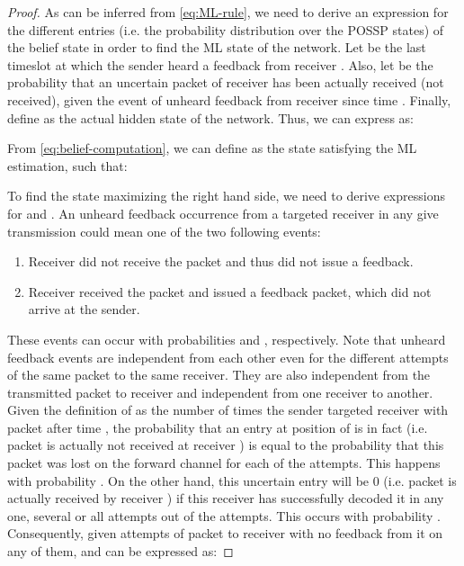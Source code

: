 \documentclass[10pt,jounral]{IEEEtran}
\begin{document}
\begin{proof}
As can be inferred from \eqref{eq:ML-rule}, we need to derive an expression for the different entries  (i.e. the probability distribution over the POSSP states) of the belief state in order to find the ML state of the network. Let  be the last timeslot at which the sender heard a feedback from receiver . Also, let   be the probability that an uncertain packet  of receiver  has been actually received (not received), given the event of unheard feedback from receiver  since time . Finally, define  as the actual hidden state of the network. Thus, we can express  as:
\begin{singlecol}

\end{singlecol}
\begin{doublecol}

\end{doublecol}

From \eqref{eq:belief-computation}, we can define  as the state satisfying the ML estimation, such that:

To find the state maximizing the right hand side, we need to derive expressions for  and . An unheard feedback occurrence from a targeted receiver  in any give transmission could mean one of the two following events:
\begin{enumerate}
\item Receiver  did not receive the packet and thus did not issue a feedback.
\item Receiver  received the packet and issued a feedback packet, which did not arrive at the sender.
\end{enumerate}
These events can occur with probabilities  and , respectively. Note that unheard feedback events are independent from each other even for the different attempts of the same packet to the same receiver. They are also independent from the transmitted packet to receiver  and independent from one receiver to another. Given the definition of  as the number of times the sender targeted receiver  with packet  after time , the probability that an  entry at position  of  is in fact  (i.e. packet  is actually not received at receiver ) is equal to the probability that this packet was lost on the forward channel for each of the  attempts. This happens with probability . On the other hand, this uncertain entry  will be 0 (i.e. packet  is actually received by receiver ) if this receiver has successfully decoded it in any one, several or all attempts out of the  attempts. This occurs with probability . Consequently, given  attempts of packet  to receiver  with no feedback from it on any of them,  and  can be expressed as:

\end{proof}
\end{document}
